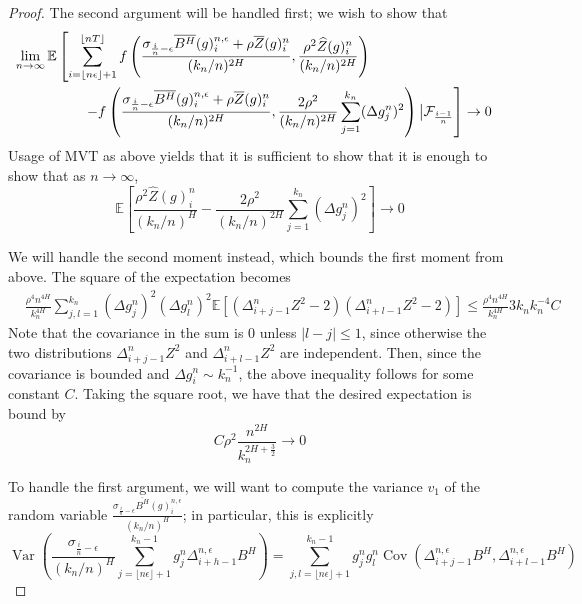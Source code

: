 \documentclass[12pt,letterpaper]{article}
\theoremstyle{definition}
\newcommand{\E}{\mathbb{E}}
\DeclareMathOperator{\Cov}{Cov}
\DeclareMathOperator{\Var}{Var}
\begin{document}
\begin{proof}
  The second argument will be handled first; we wish to show that
  \begin{align}
    \phantom{}
    &\begin{aligned}
      \mathllap{} &\lim_{n \rightarrow \infty} \E\left[ \sum_{i=\lfloor n\epsilon \rfloor + 1}^{\lfloor nT \rfloor}f\left( \frac{\sigma_{\frac{i}{n}-\epsilon}\overline{B^H}(g)^{n,\epsilon}_i + \rho\overline{Z}(g)^n_i}{(k_n/n)^{2H}}, \frac{\rho^2\widehat{Z}(g)^n_i}{(k_n/n)^{2H}}\right) \right. \\
                  &\hspace*{1.75cm} \left. - f\left( \frac{\sigma_{\frac{i}{n}-\epsilon}\overline{B^H}(g)^{n,\epsilon}_i + \rho\overline{Z}(g)^n_i}{(k_n/n)^{2H}}, \frac{2\rho^{2}}{(k_{n}/n)^{2H}}\sum_{j=1}^{k_{n}}(\Delta g^{n}_{j})^{2}\right)\big| \mathcal{F}_{\frac{i-1}{n}} \right] \rightarrow 0
    \end{aligned}
  \end{align}
  Usage of MVT as above yields that it is sufficient to show that it is enough to show that as \(n \rightarrow \infty\),
  \begin{equation}
    \E \left[ \frac{\rho^{2}\widehat{Z}(g)^{n}_{i}}{(k_{n}/n)^{H}} - \frac{2\rho^{2}}{(k_{n}/n)^{2H}}\sum_{j=1}^{k_{n}}(\Delta g^{n}_{j})^{2}\right] \rightarrow 0
  \end{equation}

  We will handle the second moment instead, which bounds the first moment from above. The square of the expectation becomes
  \begin{align*}
    & \frac{\rho^{4}n^{4H}}{k_{n}^{4H}}\sum_{j,l = 1}^{k_{n}} (\Delta g^{n}_{j})^{2}(\Delta g^{n}_{l})^{2} \E \left[ (\Delta_{i+j-1}^{n}Z^{2}  - 2) (\Delta_{i+l-1}^{n}Z^{2}  - 2)\right] \leq \frac{\rho^{4}n^{4H}}{k_{n}^{4H}} 3k_{n}k_{n}^{-4}C
  \end{align*}
  Note that the covariance in the sum is 0 unless \(|l - j| \leq 1\), since otherwise the two distributions \(\Delta_{i+j-1}^{n}Z^{2}\) and \(\Delta_{i+l-1}^{n}Z^{2}\) are independent. Then, since the covariance is bounded and \(\Delta g^{n}_{i} \sim k_{n}^{-1}\), the above inequality follows for some constant \(C\). Taking the square root, we have that the desired expectation is bound by
  \begin{equation}
    C\rho^{2}\frac{n^{2H}}{k_{n}^{2H + \frac{3}{2}}} \rightarrow 0
  \end{equation}

  To handle the first argument, we will want to compute the variance \(v_{1}\) of the random variable \(\frac{\sigma_{\frac{i}{n}-\epsilon}\overline{B^{H}}(g)^{n,\epsilon}_{i}}{(k_{n}/n)^{H}}\); in particular, this is explicitly
  \begin{equation}
    \Var \left( \frac{\sigma_{\frac{i}{n}-\epsilon}}{(k_{n}/n)^{H}}\sum_{j=\lfloor n\epsilon \rfloor + 1}^{k_{n}-1} g^{n}_{j}\Delta_{i+h-1}^{n,\epsilon}B^{H}\right) = \sum_{j,l = \lfloor n\epsilon \rfloor + 1}^{k_{n}-1}g^{n}_{j}g^{n}_{l}\Cov \left( \Delta^{n,\epsilon}_{i+j-1}B^{H}, \Delta^{n,\epsilon}_{i+l-1}B^{H} \right)
  \end{equation}


\end{proof}
\end{document}
